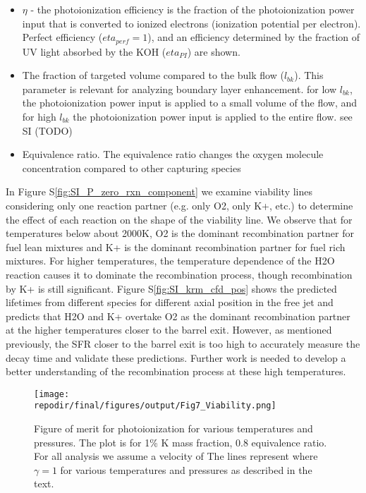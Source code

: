\begin{itemize}
    \item $\eta$ - the photoionization efficiency is the fraction of the photoionization power input that is converted to ionized electrons (ionization potential per electron). Perfect efficiency ($eta_{perf} = 1$), and an efficiency determined by the fraction of UV light absorbed by the KOH ($eta_{PI}$) are shown.
    \item The fraction of targeted volume compared to the bulk flow ($l_{bk}$). This parameter is relevant for analyzing boundary layer enhancement. for low $l_{bk}$, the photoionization power input is applied to a small volume of the flow, and for high $l_{bk}$ the photoionization power input is applied to the entire flow. see SI (TODO)
    \item Equivalence ratio. The equivalence ratio changes the oxygen molecule concentration compared to other capturing species
\end{itemize}


In Figure S\ref{fig:SI_P_zero_rxn_component} we examine viability lines considering only one reaction partner (e.g. only O2, only K+, etc.) to determine the effect of each reaction on the shape of the viability line. We observe that for temperatures below about 2000K, O2 is the dominant recombination partner for fuel lean mixtures and K+ is the dominant recombination partner for fuel rich mixtures. For higher temperatures, the temperature dependence of the H2O reaction causes it to dominate the recombination process, though recombination by K+ is still significant. Figure S\ref{fig:SI_krm_cfd_pos} shows the predicted lifetimes from different species for different axial position in the free jet and predicts that H2O and K+ overtake O2 as the dominant recombination partner at the higher temperatures closer to the barrel exit. However, as mentioned previously, the SFR closer to the barrel exit is too high to accurately measure the decay time and validate these predictions. Further work is needed to develop a better understanding of the recombination process at these high temperatures.  


\begin{figure}[h]
    \centering
    \texttt{[image: \\repodir/final/figures/output/Fig7\_Viability.png]} 
    \caption{Figure of merit for photoionization for various temperatures and pressures. The plot is for 1\% K mass fraction, 0.8 equivalence ratio. For all analysis we assume a velocity of  The lines represent where $\gamma = 1$ for various temperatures and pressures as described in the text.}   
    \label{fig:viability_gamma}
\end{figure}



